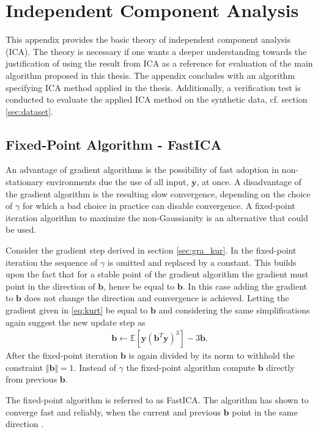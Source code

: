 \chapter{Independent Component Analysis}\label{app:ICA}
This appendix provides the basic theory of independent component analysis (ICA). The theory is necessary if one wants a deeper understanding towards the justification of using the result from ICA as a reference for evaluation of the main algorithm proposed in this thesis. 
The appendix concludes with an algorithm specifying ICA method applied in the thesis. Additionally, a verification test is conducted to evaluate the applied ICA method on the synthetic data, cf. section \ref{sec:dataset}.   
 

\section{Fixed-Point Algorithm - FastICA}
An advantage of gradient algorithms is the possibility of fast adoption in non-stationary environments due the use of all input, $\textbf{y}$, at once. A disadvantage of the gradient algorithm is the resulting slow convergence, depending on the choice of $\gamma$ for which a bad choice in practice can disable convergence. A fixed-point iteration algorithm to maximize the non-Gaussianity is an alternative that could be used.

Consider the gradient step derived in section \ref{sec:gra_kur}.
In the fixed-point iteration the sequence of $\gamma$ is omitted and replaced by a constant. This builds upon the fact that for a stable point of the gradient algorithm the gradient must point in the direction of $\mathbf{b}$, hence be equal to $\mathbf{b}$. In this case adding the gradient to $\mathbf{b}$ does not change the direction and convergence is achieved. 
Letting the gradient given in \eqref{eq:kurt} be equal to $\mathbf{b}$ and considering the same simplifications again suggest the new update step as \cite[p. 179]{ICA}
\begin{align*}
\mathbf{b} \gets \mathbb{E}[\mathbf{y}(\textbf{b}^T \textbf{y})^3] - 3 \mathbf{b}.
\end{align*}
After the fixed-point iteration $\textbf{b}$ is again divided by its norm to withhold the constraint $\Vert \textbf{b} \Vert = 1$. 
Instead of $\gamma$ the fixed-point algorithm compute $\mathbf{b}$ directly from previous $\mathbf{b}$.

The fixed-point algorithm is referred to as FastICA. The algorithm has shown to converge fast and reliably, when the current and previous $\mathbf{b}$ point in the same direction \cite[p. 179]{ICA}. 

